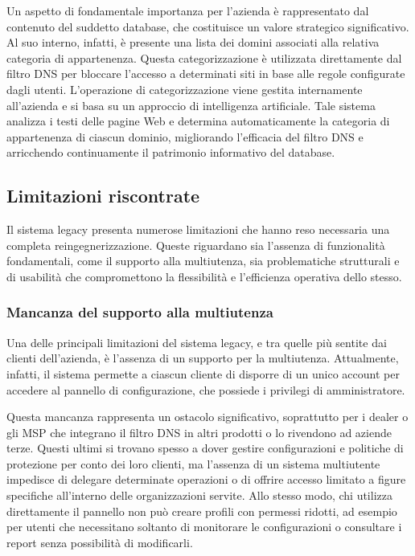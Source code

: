 Un aspetto di fondamentale importanza per l'azienda è rappresentato dal contenuto del suddetto database, che costituisce un valore strategico significativo. Al suo interno, infatti, è presente una lista dei domini associati alla relativa categoria di appartenenza. Questa categorizzazione è utilizzata direttamente dal filtro DNS per bloccare l'accesso a determinati siti in base alle regole configurate dagli utenti. L'operazione di categorizzazione viene gestita internamente all'azienda e si basa su un approccio di intelligenza artificiale. Tale sistema analizza i testi delle pagine Web e determina automaticamente la categoria di appartenenza di ciascun dominio, migliorando l'efficacia del filtro DNS e arricchendo continuamente il patrimonio informativo del database.

\subsection{Limitazioni riscontrate}
Il sistema legacy presenta numerose limitazioni che hanno reso necessaria una completa reingegnerizzazione. Queste riguardano sia l’assenza di funzionalità fondamentali, come il supporto alla multiutenza, sia problematiche strutturali e di usabilità che compromettono la flessibilità e l’efficienza operativa dello stesso.

\subsubsection{Mancanza del supporto alla multiutenza}
Una delle principali limitazioni del sistema legacy, e tra quelle più sentite dai clienti dell'azienda, è l’assenza di un supporto per la multiutenza. Attualmente, infatti, il sistema permette a ciascun cliente di disporre di un unico account per accedere al pannello di configurazione, che possiede i privilegi di amministratore.

Questa mancanza rappresenta un ostacolo significativo, soprattutto per i dealer o gli MSP che integrano il filtro DNS in altri prodotti o lo rivendono ad aziende terze. Questi ultimi si trovano spesso a dover gestire configurazioni e politiche di protezione per conto dei loro clienti, ma l'assenza di un sistema multiutente impedisce di delegare determinate operazioni o di offrire accesso limitato a figure specifiche all’interno delle organizzazioni servite. Allo stesso modo, chi utilizza direttamente il pannello non può creare profili con permessi ridotti, ad esempio per utenti che necessitano soltanto di monitorare le configurazioni o consultare i report senza possibilità di modificarli.

